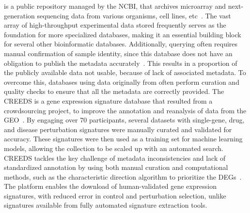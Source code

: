  is a public repository managed by the \gls{NCBI}, that archives microarray and next-generation sequencing data from various organisms, cell lines, etc~\cite{RN98}. 
The vast array of high-throughput experimental data stored frequently serves as the foundation for more specialized databases, making it an essential building block for several other bioinformatic databases. 
Additionally, querying  often requires manual confirmation of sample identity, since this database does not have an obligation to publish the metadata accurately~\cite{RN115}. 
This results in a proportion of the publicly available data  not usable, because of lack of associated metadata. 
To overcome this, databases using data originally from  often perform curation and quality checks to ensure that all the metadata are correctly provided. 
The \gls{CREEDS} is a gene expression signature database that resulted from a crowdsourcing project, to improve the annotation and reanalysis of data from the \gls{GEO}~\cite{RN87}. 
By engaging over 70 participants, several datasets with single-gene, drug, and disease perturbation signatures were manually curated and validated for accuracy. 
These signatures were then used as a training set for machine learning models, allowing the collection to be scaled up with an automated search. 
\gls{CREEDS} tackles the key challenge of metadata inconsistencies and lack of standardized annotation by using both manual curation and computational methods, such as the characteristic direction algorithm to prioritize the DEGs~\cite{RN87}. 
The platform enables the download of human-validated gene expression signatures, with reduced error in control and perturbation selection, unlike signatures available from fully automated signature extraction tools.


